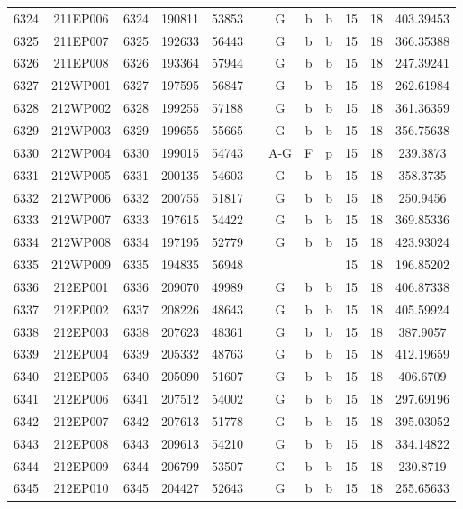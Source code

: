 \begin{tabular}{|*{12}{c|}}
6324 & 211EP006 & 6324 & 190811 & 53853 &  & G & b & b & 15 & 18 & 403.39453 \\ 
6325 & 211EP007 & 6325 & 192633 & 56443 &  & G & b & b & 15 & 18 & 366.35388 \\ 
6326 & 211EP008 & 6326 & 193364 & 57944 &  & G & b & b & 15 & 18 & 247.39241 \\ 
6327 & 212WP001 & 6327 & 197595 & 56847 &  & G & b & b & 15 & 18 & 262.61984 \\ 
6328 & 212WP002 & 6328 & 199255 & 57188 &  & G & b & b & 15 & 18 & 361.36359 \\ 
6329 & 212WP003 & 6329 & 199655 & 55665 &  & G & b & b & 15 & 18 & 356.75638 \\ 
6330 & 212WP004 & 6330 & 199015 & 54743 &  & A-G & F & p & 15 & 18 & 239.3873 \\ 
6331 & 212WP005 & 6331 & 200135 & 54603 &  & G & b & b & 15 & 18 & 358.3735 \\ 
6332 & 212WP006 & 6332 & 200755 & 51817 &  & G & b & b & 15 & 18 & 250.9456 \\ 
6333 & 212WP007 & 6333 & 197615 & 54422 &  & G & b & b & 15 & 18 & 369.85336 \\ 
6334 & 212WP008 & 6334 & 197195 & 52779 &  & G & b & b & 15 & 18 & 423.93024 \\ 
6335 & 212WP009 & 6335 & 194835 & 56948 &  &  &  &  & 15 & 18 & 196.85202 \\ 
6336 & 212EP001 & 6336 & 209070 & 49989 &  & G & b & b & 15 & 18 & 406.87338 \\ 
6337 & 212EP002 & 6337 & 208226 & 48643 &  & G & b & b & 15 & 18 & 405.59924 \\ 
6338 & 212EP003 & 6338 & 207623 & 48361 &  & G & b & b & 15 & 18 & 387.9057 \\ 
6339 & 212EP004 & 6339 & 205332 & 48763 &  & G & b & b & 15 & 18 & 412.19659 \\ 
6340 & 212EP005 & 6340 & 205090 & 51607 &  & G & b & b & 15 & 18 & 406.6709 \\ 
6341 & 212EP006 & 6341 & 207512 & 54002 &  & G & b & b & 15 & 18 & 297.69196 \\ 
6342 & 212EP007 & 6342 & 207613 & 51778 &  & G & b & b & 15 & 18 & 395.03052 \\ 
6343 & 212EP008 & 6343 & 209613 & 54210 &  & G & b & b & 15 & 18 & 334.14822 \\ 
6344 & 212EP009 & 6344 & 206799 & 53507 &  & G & b & b & 15 & 18 & 230.8719 \\ 
6345 & 212EP010 & 6345 & 204427 & 52643 &  & G & b & b & 15 & 18 & 255.65633 \\ 

\end{tabular}
